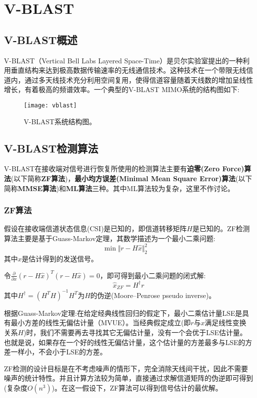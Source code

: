 \section{V-BLAST}
\subsection{V-BLAST概述}
V-BLAST（Vertical Bell Labs Layered Space-Time）是贝尔实验室提出的一种利用垂直结构来达到极高数据传输速率的无线通信技术。这种技术在一个带限无线信道内，通过多天线技术充分利用空间复用，使得信道容量随着天线数的增加呈线性增长，有着极高的频谱效率。一个典型的V-BLAST MIMO系统的结构图如下:
\begin{figure}[H]
	\centering
	\texttt{[image: vblast]}
	\caption{V-BLAST系统结构图。}
	\label{MIMO}
\end{figure}

\subsection{V-BLAST检测算法}
V-BLAST在接收端对信号进行恢复所使用的检测算法主要有\textbf{迫零(Zero Force)算法}(以下简称\textbf{ZF算法})，\textbf{最小均方误差(Minimal Mean Square Error)算法}(以下简称\textbf{MMSE算法})和\textbf{ML算法}三种。其中ML算法较为复杂，这里不作讨论。

\subsubsection{ZF算法}
假设在接收端信道状态信息(CSI)是已知的，即信道转移矩阵$H$是已知的。ZF检测算法主要是基于Guass-Markov定理，其数学描述为一个最小二乘问题:
\[
\min\Vert r-H\hat{x}\Vert_2^2\quad
\]
其中$\hat{x}$是估计得到的发送信号。\par
令$\frac{\partial}{\partial x}(r-H\hat{x})^T(r-H\hat{x})=0$，即可得到最小二乘问题的闭式解:
\[
\hat{x}_{ZF}=H^\dagger r
\]
其中$H^\dagger=(H^TH)^{-1}H^T$为$H$的伪逆(Moore–Penrose pseudo inverse)。\par
根据Guass-Markov定理:在给定经典线性回归的假定下，最小二乘估计量LSE是具有最小方差的线性无偏估计量（MVUE）。当经典假定成立(即$r$与$x$满足线性变换关系$H$)时，我们不需要再去寻找其它无偏估计量，没有一个会优于LSE估计量。也就是说，如果存在一个好的线性无偏估计量，这个估计量的方差最多与LSE的方差一样小，不会小于LSE的方差。\par
ZF检测的设计目标是在不考虑噪声的情形下，完全消除天线间干扰，因此不需要噪声的统计特性。并且计算方法较为简单，直接通过求解信道矩阵的伪逆即可得到(复杂度$O(n^3)$)。在这一假设下，ZF算法可以得到信号估计的最优解。

